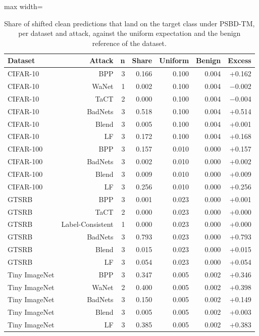 \begin{table}[htbp]
\centering
\small
\caption{Share of shifted clean predictions that land on the target class under PSBD-TM, per dataset and attack, against the uniform expectation and the benign reference of the dataset.}
\label{tab:mech-shift-target-by-dataset}
\begin{adjustbox}{max width=\linewidth}
\begin{tabular}{lrrrrrr}
\toprule
Dataset & Attack & n & Share & Uniform & Benign & Excess \\
\midrule
CIFAR-10 & BPP & 3 & 0.166 & 0.100 & 0.004 & +0.162 \\
CIFAR-10 & WaNet & 1 & 0.002 & 0.100 & 0.004 & $-$0.002 \\
CIFAR-10 & TaCT & 2 & 0.000 & 0.100 & 0.004 & $-$0.004 \\
CIFAR-10 & BadNets & 3 & 0.518 & 0.100 & 0.004 & +0.514 \\
CIFAR-10 & Blend & 3 & 0.005 & 0.100 & 0.004 & +0.001 \\
CIFAR-10 & LF & 3 & 0.172 & 0.100 & 0.004 & +0.168 \\
CIFAR-100 & BPP & 3 & 0.157 & 0.010 & 0.000 & +0.157 \\
CIFAR-100 & BadNets & 3 & 0.002 & 0.010 & 0.000 & +0.002 \\
CIFAR-100 & Blend & 3 & 0.009 & 0.010 & 0.000 & +0.009 \\
CIFAR-100 & LF & 3 & 0.256 & 0.010 & 0.000 & +0.256 \\
GTSRB & BPP & 3 & 0.001 & 0.023 & 0.000 & +0.001 \\
GTSRB & TaCT & 2 & 0.000 & 0.023 & 0.000 & +0.000 \\
GTSRB & Label-Consistent & 1 & 0.000 & 0.023 & 0.000 & +0.000 \\
GTSRB & BadNets & 3 & 0.793 & 0.023 & 0.000 & +0.793 \\
GTSRB & Blend & 3 & 0.015 & 0.023 & 0.000 & +0.015 \\
GTSRB & LF & 3 & 0.054 & 0.023 & 0.000 & +0.054 \\
Tiny ImageNet & BPP & 3 & 0.347 & 0.005 & 0.002 & +0.346 \\
Tiny ImageNet & WaNet & 2 & 0.400 & 0.005 & 0.002 & +0.398 \\
Tiny ImageNet & BadNets & 3 & 0.150 & 0.005 & 0.002 & +0.149 \\
Tiny ImageNet & Blend & 3 & 0.005 & 0.005 & 0.002 & +0.003 \\
Tiny ImageNet & LF & 3 & 0.385 & 0.005 & 0.002 & +0.383 \\
\bottomrule
\end{tabular}
\end{adjustbox}
\end{table}
